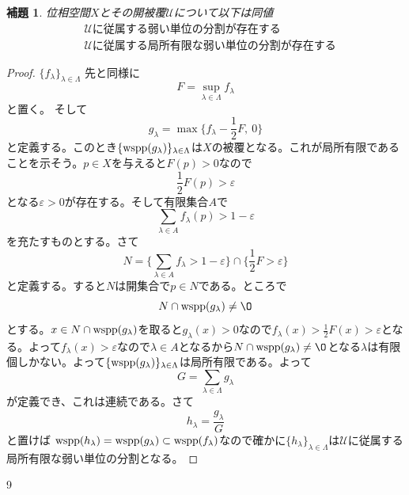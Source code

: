 \documentclass[leqno]{jsarticle}
\newtheorem{lem}[thm]{補題}
\newcommand{\ep}{\varepsilon}
\newcommand{\la}{\lambda}
\newcommand{\La}{\Lambda}
\newcommand{\wsp}{\text{{\rm wspp}}}
\newcommand{\lil}{\la\in \La}
\begin{document}
\begin{lem}\label{unit}
位相空間$X$とその開被覆$\mathcal{U}$について以下は同値
\begin{align}
&\mbox{$\mathcal{U}$に従属する弱い単位の分割が存在する}\\
&\mbox{$\mathcal{U}$に従属する局所有限な弱い単位の分割が存在する}
\end{align}
\end{lem}
\begin{proof}
$\{f_{\la}\}_{\lil}$
先と同様に
\[
F=\sup_{\lil}f_{\la}
\]
と置く。
そして
\[
g_{\la}=\max\{f_{\la}-\frac{1}{2}F,\ 0\}
\]
と定義する。このとき$\{\wsp(g_{\la})\}_{\lil}$は$X$の被覆となる。これが局所有限であることを示そう。$p\in X$を与えると$F(p)>0$なので
\[
\frac{1}{2}F(p)>\ep
\]
となる$\ep>0$が存在する。そして有限集合$A$で
\[
\sum_{\la \in A}f_{\la}(p)>1-\ep
\]
を充たすものとする。さて
\[
N=\{\sum_{\la \in A}f_{\la}>1-\ep\}\cap \{\frac{1}{2}F>\ep\}
\]
と定義する。すると$N$は開集合で$p\in N$である。ところで
\[
N\cap \wsp(g_{\la})\neq \O
\]
とする。$x\in N\cap \wsp(g_{\la})$を取ると$g_{\la}(x)>0$なので$f_{\la}(x)>\frac{1}{2}F(x)>\ep$となる。よって$f_{\la}(x)>\ep$なので$\la \in A$となるから$N\cap \wsp(g_{\la})\neq \O$となる$\la$は有限個しかない。よって$\{\wsp(g_{\la})\}_{\lil}$は局所有限である。よって
\[
G=\sum_{\la\in \La}g_{\la}
\]
が定義でき、これは連続である。さて
\[
h_{\la}=\frac{g_{\la}}{G}
\]
と置けば
$\wsp(h_{\la})=\wsp(g_{\la})\subset \wsp(f_{\la})$なので確かに$\{h_{\la}\}_{\lil}$は$\mathcal{U}$に従属する局所有限な弱い単位の分割となる。
\end{proof}













	
\begin{thebibliography}{9}

\end{thebibliography}




			
\end{document}

